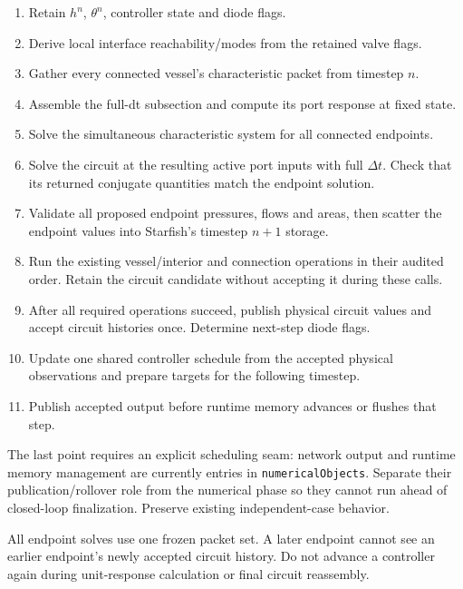 \documentclass[11pt,a4paper]{article}
\begin{document}
\begin{enumerate}
\item Retain \(h^n\), \(\theta^n\), controller state and diode flags.


\item Derive local interface reachability/modes from the retained valve flags.


\item Gather every connected vessel's characteristic packet from timestep \(n\).


\item Assemble the full-dt subsection and compute its port response at fixed state.


\item Solve the simultaneous characteristic system for all connected endpoints.


\item Solve the circuit at the resulting active port inputs with full \(\Delta t\). Check that its returned conjugate quantities match the endpoint solution.


\item Validate all proposed endpoint pressures, flows and areas, then scatter the endpoint values into Starfish's timestep \(n+1\) storage.


\item Run the existing vessel/interior and connection operations in their audited order. Retain the circuit candidate without accepting it during these calls.


\item After all required operations succeed, publish physical circuit values and accept circuit histories once. Determine next-step diode flags.


\item Update one shared controller schedule from the accepted physical observations and prepare targets for the following timestep.


\item Publish accepted output before runtime memory advances or flushes that step.


\end{enumerate}
The last point requires an explicit scheduling seam: network output and runtime memory management are currently entries in \texttt{numerical\allowbreak{}Objects}. Separate their publication/rollover role from the numerical phase so they cannot run ahead of closed-loop finalization. Preserve existing independent-case behavior.

All endpoint solves use one frozen packet set. A later endpoint cannot see an earlier endpoint's newly accepted circuit history. Do not advance a controller again during unit-response calculation or final circuit reassembly.
\end{document}

